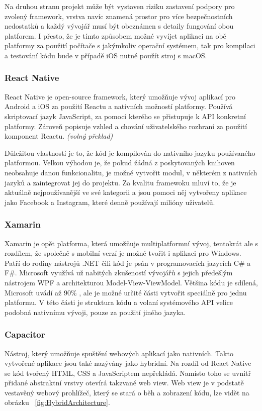 \documentclass[
  biblatex,
  glossaries,
  index
]{kidiplom}
\begin{document}
Na druhou stranu projekt může být vystaven riziku zastavení podpory pro zvolený framework, vrstva navíc znamená prostor pro více bezpečnostních nedostatků a každý vývojář musí být obeznámen s detaily fungování obou platforem. I přesto, že je tímto způsobem možné vyvíjet aplikaci na obě platformy za použití počítače s jakýmkoliv operační systémem, tak pro kompilaci a testování kódu bude v případě iOS nutné použít stroj s macOS. 


\subsubsection{React Native}
React Native je open-source framework, který umožňuje vývoj aplikací pro Android a iOS za použití Reactu a nativních možností platformy. Používá skriptovací jazyk JavaScript, za pomocí kterého se přistupuje k API konkretní platformy. Zároveň popisuje vzhled a chování  uživatelského rozhraní za použití komponent Reactu.
\cite{3}
\textit{(volný překlad)}

Důležitou vlastností je to, že kód je kompilován do nativního jazyku používaného platformou. Velkou výhodou je, že pokud žádná z poskytovaných knihoven neobsahuje danou funkcionalitu, je možné vytvořit modul, v některém z nativních jazyků a zaintegrovat jej do projektu. Za kvalitu framewoku mluví to, že je aktuálně nejpoužívanější ve své kategorii a jsou pomoci něj vytvořeny aplikace jako Facebook a Instagram, které denně používají milióny uživatelů.

\subsubsection{Xamarin}
Xamarin je opět platforma, která umožňuje multiplatformní vývoj, tentokrát ale s rozdílem, že společně s mobilní verzí je možné tvořit i aplikaci pro Windows. Patří do rodiny nástrojů .NET čili kód je psán v programovacích jazycích C\# a F\#. Microsoft využívá už nabitých zkušeností vývojářů s jejich předešlým nástrojem WPF a architekturou Model-View-ViewModel. Většina kódu je sdílená, Microsoft uvádí až 90\% \cite{4}, ale je možné určité části vytvořit speciálně pro jednu platformu. V této části je struktura kódu a volaní systémového API velice podobná nativnímu vývoji, pouze za použití jiného jazyka.

\subsubsection{Capacitor}
Nástroj, který umožňuje spuštění webových aplikací jako nativních. Takto vytvořené aplikace jsou také nazývány jako hybridní. Na rozdíl od React Native se kód tvořený HTML, CSS a JavaScriptem nepřekládá. Namísto toho se uvnitř přidané abstraktní vrstvy otevírá takzvané web view. Web view je v podstatě vestavěný webový prohlížeč, který se stará o běh a zobrazení kódu, lze vidět na obrázku ~\ref{fig:HybridArchitecture}.  
\end{document}
